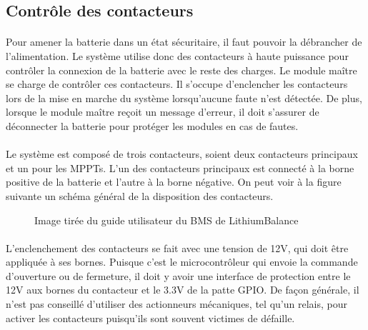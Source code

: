 
\subsection{Contrôle des contacteurs}

	\paragraph*{}
	Pour amener la batterie dans un état sécuritaire, il faut pouvoir la débrancher de l'alimentation. Le système utilise donc des contacteurs à haute puissance pour contrôler la connexion de la batterie avec le reste des charges. Le module maître se charge de contrôler ces contacteurs. Il s'occupe d'enclencher les contacteurs lors de la mise en marche du système lorsqu'aucune faute n'est détectée. De plus, lorsque le module maître reçoit un message d'erreur, il doit s'assurer de déconnecter la batterie pour protéger les modules en cas de fautes.

	\paragraph*{}
	Le système est composé de trois contacteurs, soient deux contacteurs principaux et un pour les MPPTs. L'un des contacteurs principaux est connecté à la borne positive de la batterie et l'autre à la borne négative. On peut voir à la figure suivante un schéma général de la disposition des contacteurs. 
	
	\begin{figure}[H]
		\centering
		\caption[Diagramme général des contacteurs]{Image tirée du guide utilisateur du BMS de LithiumBalance \cite{Lithium_Balance}}
		\label{fig:lithiumbalancecontactordiagram}
	\end{figure}

	\paragraph*{}
	L'enclenchement des contacteurs se fait avec une tension de 12V, qui doit être appliquée à ses bornes. Puisque c'est le microcontrôleur qui envoie la commande d'ouverture ou de fermeture, il doit y avoir une interface de protection entre le 12V aux bornes du contacteur et le 3.3V de la patte GPIO. De façon générale, il n'est pas conseillé d'utiliser des actionneurs mécaniques, tel qu'un relais, pour activer les contacteurs puisqu'ils sont souvent victimes de défaille. 	 

